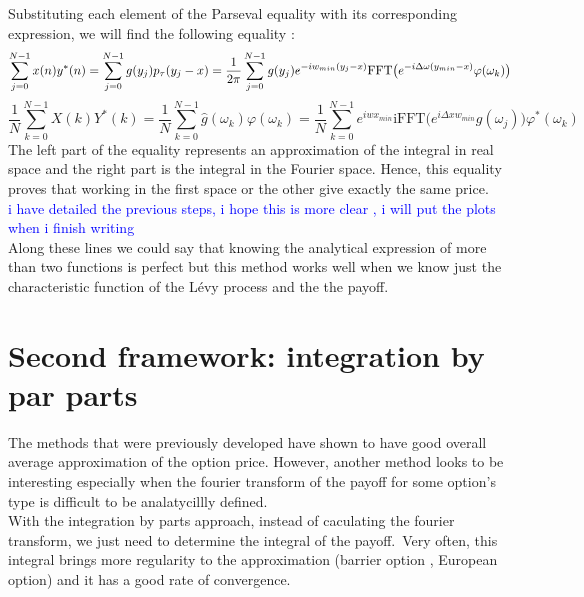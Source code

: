 \documentclass[12pt]{report}
\begin{document}
Substituting each element of the Parseval equality with its corresponding expression, we will find the following equality :
\begin{equation}
\label{sum}
\sum \limits_{j=0}^{N-1} x(n)y^*(n)= \sum \limits_{j=0}^{N-1} g(y_j) p_{\tau}(y_j-x)\\
=\frac{1}{2 \pi}\sum \limits_{j=0}^{N-1} g(y_j)e^{- iw_{min} (y_j-x)} \text{FFT} \big ( e^{-i \Delta\omega (y_{min}-x) } \varphi(\omega_k) \big)
\end{equation}
\begin{equation}
\label{rm2}
\frac{1}{N} \sum \limits_{k=0}^{N-1} X(k)Y^*(k)=\frac{1}{N}\sum \limits_{k=0}^{N-1} \hat{g}(\omega_k) \varphi(\omega_k)=\frac{1}{N}\sum \limits_{k=0}^{N-1}e^{i w x_{min}} \text{iFFT}\big ( e^{i \Delta x w_{min} } g(\omega_j) \big) \varphi^*(\omega_k)
\end{equation}
The left part of the equality represents an approximation of the integral in real space and the  right part is the integral in the Fourier space. Hence, this equality proves that working in the first space or the other give exactly the same price.\\
\textcolor{blue}{ i have detailed the previous steps, i hope this is more clear , i will put the plots when i finish writing  } \\
 Along these lines we could say that knowing the analytical expression of  more than two functions is perfect but this method works well when we know just the characteristic function of the Lévy process and the the payoff.  
\section{Second framework: integration by par parts }

The methods that were previously developed have shown to have good overall average approximation of the option price. However, another method looks to be interesting especially when the fourier transform of the payoff for some option's type is difficult to be  analatycillly defined.\\
With the integration by parts approach, instead of caculating the fourier transform, we just need to  determine the integral of the payoff.~Very often, this integral brings more regularity to the approximation (barrier option , European option) and it has a good rate of convergence.\\
\end{document}
